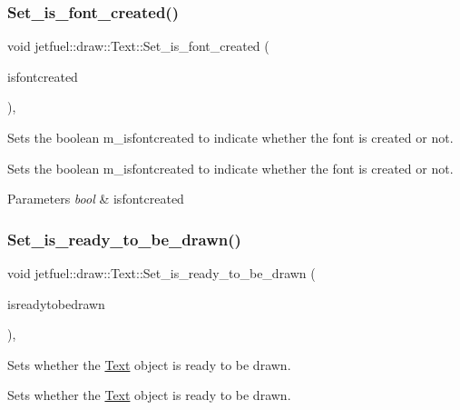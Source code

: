 \subsubsection{\texorpdfstring{Set\+\_\+is\+\_\+font\+\_\+created()}{Set\_is\_font\_created()}}
{\footnotesize\ttfamily void jetfuel\+::draw\+::\+Text\+::\+Set\+\_\+is\+\_\+font\+\_\+created (\begin{DoxyParamCaption}\item[{bool}]{isfontcreated }\end{DoxyParamCaption})\hspace{0.3cm}{\ttfamily [inline]}, {\ttfamily [protected]}}



Sets the boolean m\+\_\+isfontcreated to indicate whether the font is created or not. 

Sets the boolean m\+\_\+isfontcreated to indicate whether the font is created or not.


\begin{DoxyParams}{Parameters}
{\em bool} & isfontcreated \\
\hline
\end{DoxyParams}
\mbox{\label{classjetfuel_1_1draw_1_1Text_a9d7e2d4cd2ca03fa2ca03f91964b26f7}} 
\subsubsection{\texorpdfstring{Set\+\_\+is\+\_\+ready\+\_\+to\+\_\+be\+\_\+drawn()}{Set\_is\_ready\_to\_be\_drawn()}}
{\footnotesize\ttfamily void jetfuel\+::draw\+::\+Text\+::\+Set\+\_\+is\+\_\+ready\+\_\+to\+\_\+be\+\_\+drawn (\begin{DoxyParamCaption}\item[{bool}]{isreadytobedrawn }\end{DoxyParamCaption})\hspace{0.3cm}{\ttfamily [inline]}, {\ttfamily [protected]}}



Sets whether the \hyperlink{classjetfuel_1_1draw_1_1Text}{Text} object is ready to be drawn. 

Sets whether the \hyperlink{classjetfuel_1_1draw_1_1Text}{Text} object is ready to be drawn.


